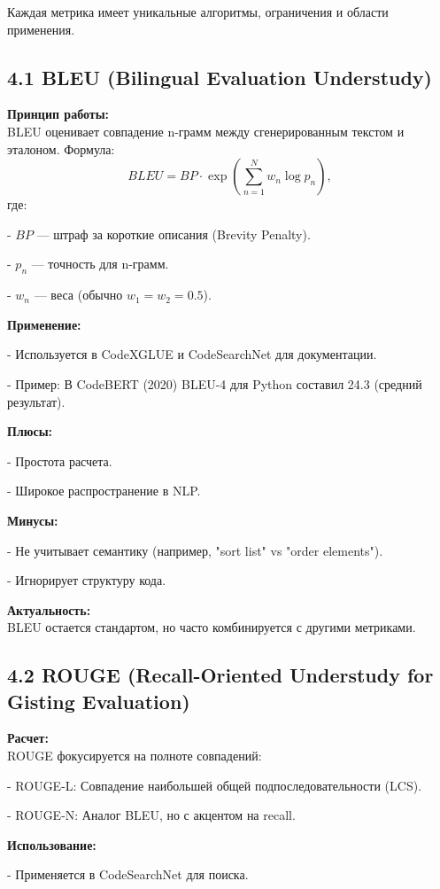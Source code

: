 \documentclass[14pt]{article}
\theoremstyle{definition}
\begin{document}
Каждая метрика имеет уникальные алгоритмы, ограничения и области применения.

\subsection*{4.1 BLEU (Bilingual Evaluation Understudy)}

\textbf{Принцип работы:} \\
BLEU оценивает совпадение n-грамм между сгенерированным текстом и эталоном. Формула:
\[
BLEU = BP \cdot \exp\left(\sum_{n=1}^{N} w_n \log p_n\right),
\]
где:

    
- $BP$ — штраф за короткие описания (Brevity Penalty).
    
- $p_n$ — точность для n-грамм.
    
- $w_n$ — веса (обычно $w_1 = w_2 = 0.5$).


\textbf{Применение:}

    
- Используется в CodeXGLUE и CodeSearchNet для документации.
    
- Пример: В CodeBERT (2020) BLEU-4 для Python составил 24.3 (средний результат).


\textbf{Плюсы:}

    
- Простота расчета.
    
- Широкое распространение в NLP.


\textbf{Минусы:}

    
- Не учитывает семантику (например, "sort list" vs "order elements").
    
- Игнорирует структуру кода.


\textbf{Актуальность:} \\
BLEU остается стандартом, но часто комбинируется с другими метриками.

\subsection*{4.2 ROUGE (Recall-Oriented Understudy for Gisting Evaluation)}

\textbf{Расчет:} \\
ROUGE фокусируется на полноте совпадений:

    
- ROUGE-L: Совпадение наибольшей общей подпоследовательности (LCS).
    
- ROUGE-N: Аналог BLEU, но с акцентом на recall.


\textbf{Использование:}

    
- Применяется в CodeSearchNet для поиска.
    
\end{document}
